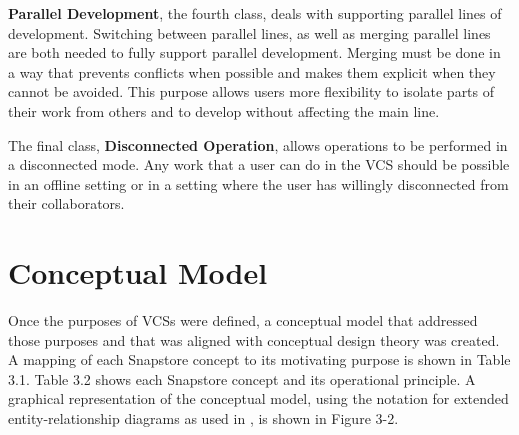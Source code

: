 \textbf{Parallel Development}, the fourth class, deals with supporting parallel lines of development. Switching between parallel lines, as well as merging parallel lines are both needed to fully support parallel development. Merging must be done in a way that prevents conflicts when possible and makes them explicit when they cannot be avoided. This purpose allows users more flexibility to isolate parts of their work from others and to develop without affecting the main line.

The final class, \textbf{Disconnected Operation}, allows operations to be performed in a disconnected mode. Any work that a user can do in the VCS should be possible in an offline setting or in a setting where the user has willingly disconnected from their collaborators.

\section{Conceptual Model}

Once the purposes of VCSs were defined, a conceptual model that addressed those purposes and that was aligned with conceptual design theory \cite{Jackson} was created. A mapping of each Snapstore concept to its motivating purpose is shown in Table 3.1. Table 3.2 shows each Snapstore concept and its operational principle. A graphical representation of the conceptual model, using the notation for extended entity-relationship diagrams as used in \cite{SantiagoJackson}, is shown in Figure 3-2.

